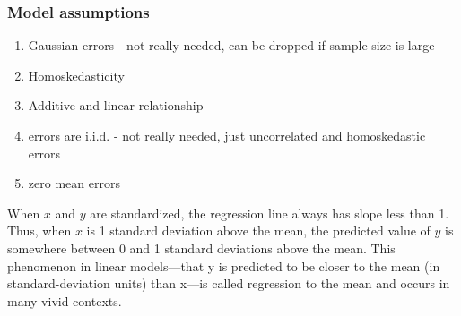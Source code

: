 \documentclass{article}
\begin{document}
\subsubsection{Model assumptions}
\begin{enumerate}
  \item Gaussian errors - not really needed, can be dropped if sample size is large
  \item Homoskedasticity
  \item Additive and linear relationship
  \item errors are i.i.d. - not really needed, just uncorrelated and homoskedastic errors
  \item zero mean errors
\end{enumerate}

When $x$ and $y$ are standardized, the regression line always has slope less than 1.
Thus, when $x$ is 1 standard deviation above the mean, the predicted value of $y$ is somewhere between 0 and 1 standard deviations above the mean. This phenomenon in linear models—that y is predicted to be closer to the mean (in standard-deviation units) than x—is called regression to the mean and occurs in many vivid contexts.
\end{document}
